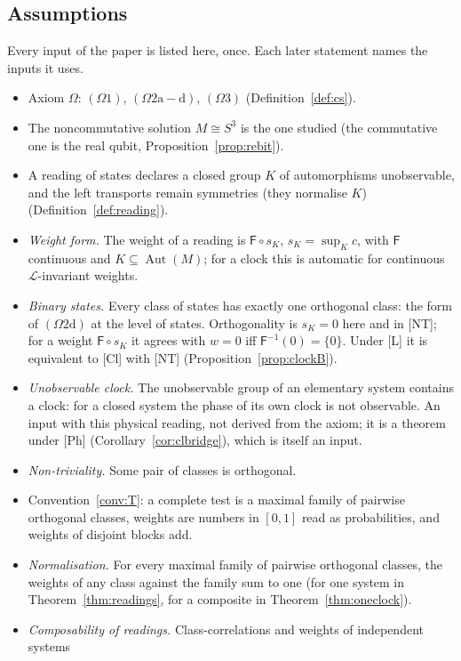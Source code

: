 \documentclass[aps,pra,onecolumn,superscriptaddress,nofootinbib,10pt]{revtex4-2}
\theoremstyle{definition}
\theoremstyle{remark}
\newcommand{\cL}{\mathcal{L}}
\newcommand{\Aut}{\operatorname{Aut}}
\begin{document}
\subsection{Assumptions}\label{sec:assumptions}
Every input of the paper is listed here, once.  Each later statement names the inputs it uses.
\begin{itemize}[leftmargin=1.6em]
\item[$(\Omega)$] Axiom $\Omega$: $(\Omega1)$, $(\Omega2\mathrm{a{-}d})$, $(\Omega3)$ (Definition~\ref{def:cs}).
\item[{[NC]}] The noncommutative solution $M\cong S^3$ is the one studied (the commutative one is the
real qubit, Proposition~\ref{prop:rebit}).
\item[{[L]}] A reading of states declares a closed group $K$ of automorphisms unobservable, and the left
transports remain symmetries (they normalise $K$) (Definition~\ref{def:reading}).
\item[{[W]}] \emph{Weight form.}  The weight of a reading is $\mathsf F\circ s_K$, $s_K=\sup_Kc$, with $\mathsf F$ continuous and
$K\subseteq\Aut(M)$; for a clock this is automatic for continuous $\cL$-invariant weights.
\item[{[B]}] \emph{Binary states.}  Every class of states has exactly one orthogonal class: the form of
$(\Omega2\mathrm d)$ at the level of states.  Orthogonality is $s_K=0$ here and in [NT]; for a weight $\mathsf F\circ s_K$
it agrees with $w=0$ iff $\mathsf F^{-1}(0)=\{0\}$.  Under [L] it is equivalent to [Cl] with [NT] (Proposition~\ref{prop:clockB}).
\item[{[Cl]}] \emph{Unobservable clock.}  The unobservable group of an elementary system contains a clock:
for a closed system the phase of its own clock is not observable.  An input with this physical reading,
not derived from the axiom; it is a theorem under [Ph] (Corollary~\ref{cor:clbridge}), which is itself an input.
\item[{[NT]}] \emph{Non-triviality.}  Some pair of classes is orthogonal.
\item[{[T]}] Convention~\ref{conv:T}: a complete test is a maximal family of pairwise orthogonal classes,
weights are numbers in $[0,1]$ read as probabilities, and weights of disjoint blocks add.
\item[{[N]}] \emph{Normalisation.}  For every maximal family of pairwise orthogonal classes, the weights of
any class against the family sum to one (for one system in Theorem~\ref{thm:readings}, for a composite in
Theorem~\ref{thm:oneclock}).
\item[{[Comp]}] \emph{Composability of readings.}  Class-correlations and weights of independent systems

\end{itemize}
\end{document}

